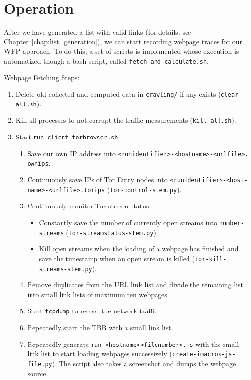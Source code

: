 \section{Operation}
\label{sec:fetching_operation}

After we have generated a list with valid links (for details, see Chapter~\ref{chap:list_generation}), we can start recording webpage traces for our \ac{WFP} approach. To do this, a set of scripts is implemented whose execution is automatized though a bash script, called \texttt{fetch-and-calculate.sh}.

\begin{listing}
Webpage Fetching Steps:
\begin{enumerate}
    \item Delete old collected and computed data in \texttt{crawling/} if any exists (\texttt{clear- all.sh}).
    \item Kill all processes to not corrupt the traffic measurements (\texttt{kill-all.sh}).
    \item Start \texttt{run-client-torbrowser.sh}:
    \begin{enumerate}
	\item Save our own \ac{IP} address into \texttt{<runidentifier>-<hostname>-<urlfile>. ownips}.
	\item Continuously save \ac{IP}s of Tor Entry nodes into \texttt{<runidentifier>-<host- name>-<urlfile>.torips} (\texttt{tor-control-stem.py}).
        \item Continuously monitor Tor stream status:
        \begin{itemize}
	  \item Constantly save the number of currently open streams into \texttt{number-streams} (\texttt{tor-streamstatus-stem.py}).
          \item Kill open streams when the loading of a webpage has finished and save the timestamp when an open stream is killed (\texttt{tor-kill-streams-stem.py}).
        \end{itemize}
        \item Remove duplicates from the \ac{URL} link list and divide the remaining list into small link lists of maximum ten webpages.
        \item Start \texttt{tcpdump} to record the network traffic.
        \item Repeatedly start the \ac{TBB} with a small link list
        \item Repeatedly generate \texttt{run-<hostname><filenumber>.js} with the small link list to start loading webpages successively (\texttt{create-imacros-js-file.py}). The script also takes a screenshot and dumps the webpage source.

\end{enumerate}
\end{enumerate}
\end{listing}
